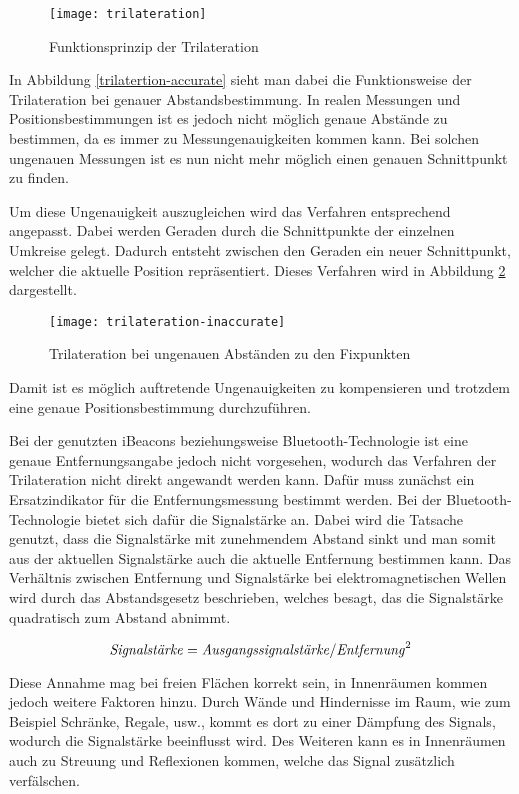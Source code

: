 \begin{figure}[htb!]
	\centering
	\texttt{[image: trilateration]}
	\caption{Funktionsprinzip der Trilateration}
	\label{trilateration-accurate}
\end{figure}

In Abbildung \ref{trilatertion-accurate} sieht man dabei die Funktionsweise der Trilateration bei genauer Abstandsbestimmung. In realen Messungen und Positionsbestimmungen ist es jedoch nicht möglich genaue Abstände zu bestimmen, da es immer zu Messungenauigkeiten kommen kann.
Bei solchen ungenauen Messungen ist es nun nicht mehr möglich einen genauen Schnittpunkt zu finden. 

Um diese Ungenauigkeit auszugleichen wird das Verfahren entsprechend angepasst. Dabei werden Geraden durch die Schnittpunkte der einzelnen Umkreise gelegt. Dadurch entsteht zwischen den Geraden ein neuer Schnittpunkt, welcher die aktuelle Position repräsentiert. Dieses Verfahren wird in Abbildung \ref{trilateration-inaccurate} dargestellt.

\begin{figure}[htb!]
		\centering
	\texttt{[image: trilateration-inaccurate]}
	\caption{Trilateration bei ungenauen Abständen zu den Fixpunkten}
	\label{trilateration-inaccurate}
\end{figure}

Damit ist es möglich auftretende Ungenauigkeiten zu kompensieren und trotzdem eine genaue Positionsbestimmung durchzuführen.

Bei der genutzten iBeacons beziehungsweise Bluetooth-Technologie ist eine genaue Entfernungsangabe jedoch nicht vorgesehen, wodurch das Verfahren der Trilateration nicht direkt angewandt werden kann. Dafür muss zunächst ein Ersatzindikator für die Entfernungsmessung bestimmt werden.
Bei der Bluetooth-Technologie bietet sich dafür die Signalstärke an.
Dabei wird die Tatsache genutzt, dass die Signalstärke mit zunehmendem Abstand sinkt und man somit aus der aktuellen Signalstärke auch die aktuelle Entfernung bestimmen kann. 
Das Verhältnis zwischen Entfernung und Signalstärke bei elektromagnetischen Wellen wird durch das Abstandsgesetz beschrieben, welches besagt, das die Signalstärke quadratisch zum Abstand abnimmt.

\begin{equation}
	\text{\emph{Signalstärke}} = \text{\emph{Ausgangssignalstärke}}/\text{\emph{Entfernung}}^2
\end{equation}

Diese Annahme mag bei freien Flächen korrekt sein, in Innenräumen kommen jedoch weitere Faktoren hinzu. 
Durch Wände und Hindernisse im Raum, wie zum Beispiel Schränke, Regale, usw., kommt es dort zu einer Dämpfung des Signals, wodurch die Signalstärke beeinflusst wird. Des Weiteren kann es in Innenräumen auch zu Streuung und Reflexionen kommen, welche das Signal zusätzlich verfälschen.

